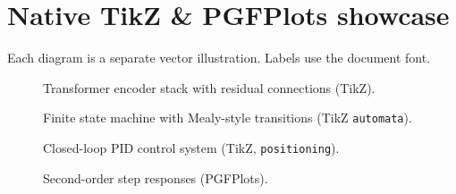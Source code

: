 \documentclass[a4paper,11pt]{article}
\begin{document}
\section*{Native TikZ \& PGFPlots showcase}
Each diagram is a separate vector illustration. Labels use the document font.
\begin{figure}[htbp]\centering\caption{Transformer encoder stack with residual connections (TikZ).}\end{figure}
\begin{figure}[htbp]\centering\caption{Finite state machine with Mealy-style transitions (TikZ \texttt{automata}).}\end{figure}
\begin{figure}[htbp]\centering\caption{Closed-loop PID control system (TikZ, \texttt{positioning}).}\end{figure}
\begin{figure}[htbp]\centering\begin{minipage}{0.7\linewidth}\end{minipage}\caption{Second-order step responses (PGFPlots).}\end{figure}
\end{document}
